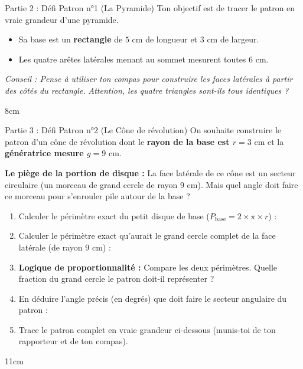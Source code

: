 \documentclass[a4paper]{book}
\begin{document}
    \begin{exerciceTitre}{Partie 2 : Défi Patron n°1 (La Pyramide)}
        Ton objectif est de tracer le patron en vraie grandeur d'une pyramide.
        \begin{itemize}
            \item Sa base est un \textbf{rectangle} de $5\text{ cm}$ de longueur et $3\text{ cm}$ de largeur.
            \item Les quatre arêtes latérales menant au sommet mesurent toutes \textbf{$6\text{ cm}$}.
        \end{itemize}
        \textit{Conseil : Pense à utiliser ton compas pour construire les faces latérales à partir des côtés du rectangle. Attention, les quatre triangles sont-ils tous identiques ?}
    \end{exerciceTitre}

    \begin{ZoneReponse}{8cm}
    \end{ZoneReponse}

\newpage

    \begin{exerciceTitre}{Partie 3 : Défi Patron n°2 (Le Cône de révolution)}
        On souhaite construire le patron d'un cône de révolution dont le \textbf{rayon de la base est $r = 3\text{ cm}$} et la \textbf{génératrice mesure $g = 9\text{ cm}$}.
        
        \textbf{Le piège de la portion de disque :} La face latérale de ce cône est un secteur circulaire (un morceau de grand cercle de rayon $9\text{ cm}$). Mais quel angle doit faire ce morceau pour s'enrouler pile autour de la base ?
        
        \begin{enumerate}
            \item Calculer le périmètre exact du petit disque de base ($P_{\text{base}} = 2 \times \pi \times r$) : \\
            \dotfill
            \item Calculer le périmètre exact qu'aurait le grand cercle complet de la face latérale (de rayon $9\text{ cm}$) : \\
            \dotfill
            \item \textbf{Logique de proportionnalité :} Compare les deux périmètres. Quelle fraction du grand cercle le patron doit-il représenter ? \\
            \dotfill
            \item En déduire l'angle précis (en degrés) que doit faire le secteur angulaire du patron : \\
            \dotfill
            \item Trace le patron complet en vraie grandeur ci-dessous (munis-toi de ton rapporteur et de ton compas).
        \end{enumerate}
    \end{exerciceTitre}
    
    \begin{ZoneReponse}{11cm}
    \end{ZoneReponse}
\end{document}
